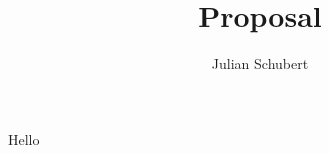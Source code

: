 \documentclass{article}
\title{Proposal}
\author{Julian Schubert}
\begin{document}
\maketitle

Hello
\end{document}
